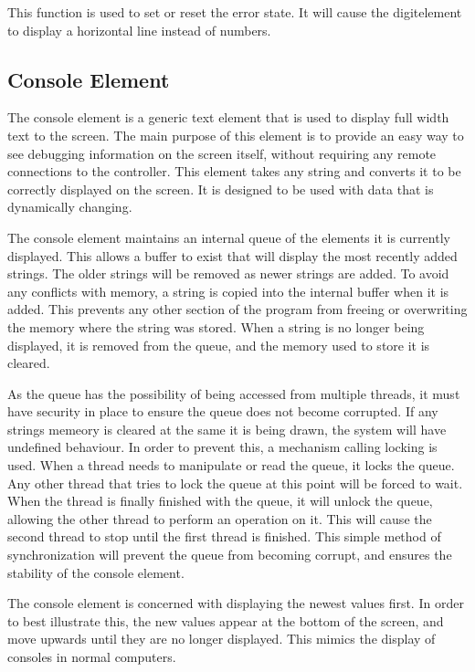 This function is used to set or reset the error state. It will cause the digitelement to display a horizontal line instead of numbers. 

\subsection{Console Element}

The console element is a generic text element that is used to display full width text to the screen. The main purpose of this element is to provide an easy way to see debugging information on the screen itself, without requiring any remote connections to the controller. This element takes any string and converts it to be correctly displayed on the screen. It is designed to be used with data that is dynamically changing.

The console element maintains an internal queue of the elements it is currently displayed. This allows a buffer to exist that will display the most recently added strings. The older strings will be removed as newer strings are added. To avoid any conflicts with memory, a string is copied into the internal buffer when it is added. This prevents any other section of the program from freeing or overwriting the memory where the string was stored. When a string is no longer being displayed, it is removed from the queue, and the memory used to store it is cleared.

As the queue has the possibility of being accessed from multiple threads, it must have security in place to ensure the queue does not become corrupted. If any strings memeory is cleared at the same it is being drawn, the system will have undefined behaviour. In order to prevent this, a mechanism calling locking is used. When a thread needs to manipulate or read the queue, it locks the queue. Any other thread that tries to lock the queue at this point will be forced to wait. When the thread is finally finished with the queue, it will unlock the queue, allowing the other thread to perform an operation on it. This will cause the second thread to stop until the first thread is finished. This simple method of synchronization will prevent the queue from becoming corrupt, and ensures the stability of the console element.

The console element is concerned with displaying the newest values first. In order to best illustrate this, the new values appear at the bottom of the screen, and move upwards until they are no longer displayed. This mimics the display of consoles in normal computers. 

